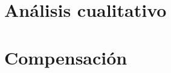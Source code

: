 \section{Análisis cualitativo}
\resetallcounters
%
\clearpage

\section{Compensación}
\resetallcounters
%
\clearpage



